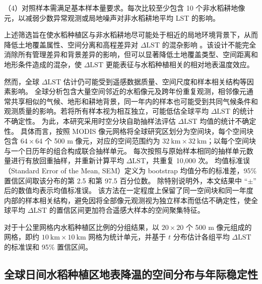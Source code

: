 （4）对照样本需满足基本样本量要求。每次比较至少包含 10 个非水稻耕地像元，以减弱少数异常观测或局地噪声对非水稻耕地平均 LST 的影响。

上述筛选旨在使水稻种植区与非水稻耕地尽可能处于相近的局地环境背景下，从而降低土地覆盖属性、空间分离和高程差异对 $\Delta\mathrm{LST}$ 的混杂影响 \cite{Bright2017LCMC,Chen2024Croplands}。该设计不能完全消除所有管理差异和背景差异的影响，但可以显著降低土地覆盖类型、空间距离和地形条件造成的混杂，使 $\Delta\mathrm{LST}$ 更能表征与水稻种植相关的相对地表温度效应。

然而，全球 $\Delta\mathrm{LST}$ 估计仍可能受到遥感数据质量、空间尺度和样本相关结构等因素影响。
全球分析包含大量空间邻近的水稻像元及跨年份重复观测，相邻像元通常共享相似的气候、地形和耕地背景，同一年内的样本也可能受到共同气候条件和观测质量的影响。若将所有样本视为相互独立，可能低估全球平均 $\Delta\mathrm{LST}$ 的统计不确定性。
为此，本研究采用时空分块自助抽样法评估 $\Delta\mathrm{LST}$ 均值的统计不确定性。
具体而言，按照 MODIS 像元网格将全球研究区划分为空间块，每个空间块包含 $64\times64$ 个 500 m 像元，对应的空间范围约为 $32~\mathrm{km}\times32~\mathrm{km}$；以每个空间块与一个日历年的组合构成联合抽样单元。
每次按照与原始样本相同的抽样单元数量进行有放回重抽样，并重新计算平均 $\Delta\mathrm{LST}$，共重复 10,000 次。
均值标准误（Standard Error of the Mean, SEM）定义为 bootstrap 均值分布的标准差，95\% 置信区间取该分布的第 2.5 和第 97.5 百分位数。
除特别说明外，本文结果中 ``$\pm$'' 后的数值均表示均值标准误。
该方法在一定程度上保留了同一空间块和同一年度内部的样本相关结构，避免因将全部像元观测视为独立样本而低估不确定性，使全球平均 $\Delta\mathrm{LST}$ 的置信区间更加符合遥感大样本的空间聚集特征。

对于十公里网格内水稻种植区比例的分组结果，以 $20\times20$ 个 500 m 像元组成的网格，即约 $10\ \mathrm{km}\times10\ \mathrm{km}$ 网格为统计单元，并基于 $t$ 分布估计各组平均 $\Delta\mathrm{LST}$ 的标准误和 95\% 置信区间。


\subsection{全球日间水稻种植区地表降温的空间分布与年际稳定性}


